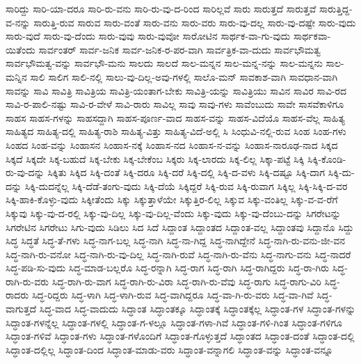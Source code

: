 {ಸಾರಿದ್ದು
ಸಾರಿ-ಯಾ-ದರೂ
ಸಾರಿ-ರು-ವನು
ಸಾರಿ-ರು-ವು-ದ-ರಿಂದ
ಸಾರಿಲ್ಲವೆ
ಸಾರು
ಸಾರುತ್ತದೆ
ಸಾರುತ್ತವೆ
ಸಾರುತ್ತಿದ್ದ-ವ-ನನ್ನು
ಸಾರುತ್ತಿ-ರುವ
ಸಾರುವ
ಸಾರು-ವಂತೆ
ಸಾರು-ವನು
ಸಾರು-ವರು
ಸಾರು-ವು-ದಲ್ಲ
ಸಾರು-ವು-ದಷ್ಟೇ
ಸಾರು-ವುದು
ಸಾರು-ವುದೆ
ಸಾರು-ವು-ದೆಂದು
ಸಾರು-ವುವು
ಸಾರು-ವುವೋ
ಸಾರೋಟಿನ
ಸಾರ್ಥಕ-ವಾ-ಗು-ವುದು
ಸಾರ್ಥಕವಾ-ಯಿತೆಂದು
ಸಾರ್ವಂತರ್
ಸಾರ್ವ-ಜನಿಕ
ಸಾರ್ವ-ಜನಿಕ-ರ-ಪರ-ವಾಗಿ
ಸಾರ್ವತ್ರಿಕ-ವಾ-ದುದು
ಸಾರ್ವಭೌಮತ್ವ
ಸಾರ್ವಭೌಮತ್ವ-ವನ್ನು
ಸಾರ್ವಭೌ-ಮನು
ಸಾಲದು
ಸಾಲದೆ
ಸಾಲ-ಮನ್ನನ
ಸಾಲ-ಮನ್ನ-ನನ್ನು
ಸಾಲ-ಮನ್ನನು
ಸಾಲ-ಮನ್ನಿನ
ಸಾಲಿ
ಸಾಲಿಗ
ಸಾಲಿ-ನಲ್ಲಿ
ಸಾಲು-ವು-ದಿಲ್ಲ-ಅವು-ಗಳಲ್ಲಿ
ಸಾಲೊ-ಮನ್
ಸಾವಕಾಶ-ವಾಗಿ
ಸಾವಧಾನ-ವಾಗಿ
ಸಾವನ್ನು
ಸಾವಿ
ಸಾವಿತ್ರಿ
ಸಾವಿತ್ರಿಯ
ಸಾವಿತ್ರಿ-ಯಂತಾಗ-ಬೇಕು
ಸಾವಿತ್ರಿ-ಯನ್ನು
ಸಾವಿತ್ರಿಯು
ಸಾವಿನ
ಸಾವಿರ
ಸಾವಿ-ರದ
ಸಾವಿ-ರ-ಪಾಲಿ-ನಷ್ಟು
ಸಾವಿ-ರ-ವೇಳೆ
ಸಾವಿ-ರಾರು
ಸಾವಿಲ್ಲ
ಸಾವು
ಸಾವು-ಗಳು
ಸಾವೆಂಬುದು
ಸಾವೇ
ಸಾಸವೆಕಾಳಿಗೂ
ಸಾಹಸ
ಸಾಹಸ-ಗಳನ್ನು
ಸಾಹಸದ್ದಾಗಿ
ಸಾಹಸ-ಪೂರ್ಣ-ವಾದ
ಸಾಹಸ-ವನ್ನು
ಸಾಹಸ-ವಿದೆಯೊ
ಸಾಹಸ-ವೆಲ್ಲ
ಸಾಹಿತ್ಯ
ಸಾಹಿತ್ಯದ
ಸಾಹಿತ್ಯ-ದಲ್ಲಿ
ಸಾಹಿತ್ಯ-ರಾಶಿ
ಸಾಹಿತ್ಯ-ವಿತ್ತು
ಸಾಹಿತ್ಯ-ವಿದೆ-ಅಲ್ಲಿ
ಸಿ
ಸಿಂಧುವಿ-ನಲ್ಲಿ-ರುವ
ಸಿಂಹ
ಸಿಂಹ-ಗಳು
ಸಿಂಹದ
ಸಿಂಹ-ವನ್ನು
ಸಿಂಹಾಸನ
ಸಿಂಹಾಸ-ನಕ್ಕೆ
ಸಿಂಹಾಸ-ನದ
ಸಿಂಹಾಸ-ನ-ವನ್ನು
ಸಿಂಹಾಸ-ನಾರೂಢ-ನಾದ
ಸಿಕ್ಕದ
ಸಿಕ್ಕದೆ
ಸಿಕ್ಕದೇ
ಸಿಕ್ಕ-ಬಹುದೆ
ಸಿಕ್ಕ-ಬೇಕು
ಸಿಕ್ಕ-ಬೇಕೆಂಬ
ಸಿಕ್ಕರು
ಸಿಕ್ಕ-ಲಾರದು
ಸಿಕ್ಕ-ಲಿಲ್ಲ
ಸಿಕ್ಕಾ-ಪಟ್ಟೆ
ಸಿಕ್ಕಿ
ಸಿಕ್ಕಿ-ಕೊಂಡಿ-ರು-ವು-ದನ್ನು
ಸಿಕ್ಕಿತು
ಸಿಕ್ಕಿದ
ಸಿಕ್ಕಿ-ದಂತೆ
ಸಿಕ್ಕಿ-ದರೂ
ಸಿಕ್ಕಿ-ದರೆ
ಸಿಕ್ಕಿ-ದಲ್ಲಿ
ಸಿಕ್ಕಿ-ದ-ವಳು
ಸಿಕ್ಕಿ-ದಷ್ಟೂ
ಸಿಕ್ಕಿ-ದಾಗ
ಸಿಕ್ಕಿ-ದು-ದನ್ನು
ಸಿಕ್ಕಿ-ದುದನ್ನೆಲ್ಲ
ಸಿಕ್ಕಿ-ದೆಡೆ-ತಂಗು-ವುದು
ಸಿಕ್ಕಿ-ದೆಯೆ
ಸಿಕ್ಕಿದ್ದರೆ
ಸಿಕ್ಕಿ-ರುವ
ಸಿಕ್ಕಿ-ರುವಾಗ
ಸಿಕ್ಕಿಲ್ಲ
ಸಿಕ್ಕಿ-ಸಿಕ್ಕಿ-ದ-ವರ
ಸಿಕ್ಕಿ-ಹಾಕಿ-ಕೊಳ್ಳು-ವುದು
ಸಿಕ್ಕೀತೆಂದು
ಸಿಕ್ಕು
ಸಿಕ್ಕುತ್ತಾಳೆಯೇ
ಸಿಕ್ಕುತ್ತಿರ-ಲಿಲ್ಲ
ಸಿಕ್ಕುವ
ಸಿಕ್ಕು-ವಂತಿಲ್ಲ
ಸಿಕ್ಕು-ವ-ವ-ರೆಗೆ
ಸಿಕ್ಕುವು
ಸಿಕ್ಕು-ವು-ದ-ರಲ್ಲಿ
ಸಿಕ್ಕು-ವು-ದಿಲ್ಲ
ಸಿಕ್ಕು-ವು-ದಿಲ್ಲ-ವೆಂದು
ಸಿಕ್ಕು-ವುದು
ಸಿಕ್ಕು-ವು-ದೆಂಬು-ದನ್ನು
ಸಿಗರೇಟನ್ನು
ಸಿಗರೇಟಿನ
ಸಿಗರೇಟು
ಸಿಗು-ವುದು
ಸಿಡಿಲು
ಸಿದ
ಸಿದೆ
ಸಿದ್ದಾಂತ
ಸಿದ್ದಾಂತದ
ಸಿದ್ದಾಂತ-ವಲ್ಲ
ಸಿದ್ದಾಂತವು
ಸಿದ್ದಾನೊ
ಸಿದ್ದು
ಸಿದ್ಧ
ಸಿದ್ಧತೆ
ಸಿದ್ಧ-ತೆ-ಗಳು
ಸಿದ್ಧ-ನಾಗ-ಬಲ್ಲ
ಸಿದ್ಧ-ನಾಗಿ
ಸಿದ್ಧ-ನಾ-ಗಿದ್ದ
ಸಿದ್ಧ-ನಾಗಿದ್ದೇನೆ
ಸಿದ್ಧ-ನಾಗಿ-ರು-ವನು-ಜೀ-ವನ
ಸಿದ್ಧ-ನಾಗಿ-ರು-ವನೋ
ಸಿದ್ಧ-ನಾಗಿ-ರು-ವು-ದಿಲ್ಲ
ಸಿದ್ಧ-ನಾಗಿ-ರುವೆ
ಸಿದ್ಧ-ನಾಗಿ-ರು-ವೆನು
ಸಿದ್ಧ-ನಾಗು-ವನು
ಸಿದ್ಧ-ನಾದರೆ
ಸಿದ್ಧ-ಪಡಿ-ಸು-ವುದು
ಸಿದ್ಧ-ಮಾಡ-ಬಲ್ಲರೊ
ಸಿದ್ಧ-ರನ್ನಾಗಿ
ಸಿದ್ಧ-ರಾಗ
ಸಿದ್ಧ-ರಾಗಿ
ಸಿದ್ಧ-ರಾಗಿದ್ದರು
ಸಿದ್ಧ-ರಾ-ಗಿರು
ಸಿದ್ಧ-ರಾಗಿ-ರು-ವರು
ಸಿದ್ಧ-ರಾಗಿ-ರು-ವಾಗ
ಸಿದ್ಧ-ರಾಗಿ-ರು-ವಿರಾ
ಸಿದ್ಧ-ರಾಗಿ-ರು-ವೆವು
ಸಿದ್ಧ-ರಾಗು
ಸಿದ್ಧ-ರಾಗು-ವಿರಿ
ಸಿದ್ಧ-ರಾದರು
ಸಿದ್ಧ-ರಿದ್ದರು
ಸಿದ್ಧ-ಳಾಗಿ
ಸಿದ್ಧ-ಳಾಗಿ-ರುವ
ಸಿದ್ಧ-ವಾಗಿದ್ದರೂ
ಸಿದ್ಧ-ವಾ-ಗಿ-ರು-ವರು
ಸಿದ್ಧ-ವಾ-ಗಿವೆ
ಸಿದ್ಧ-ವಾಗುತ್ತದೆ
ಸಿದ್ಧ-ವಾದ
ಸಿದ್ಧ-ವಾದುದು
ಸಿದ್ಧಾಂತ
ಸಿದ್ಧಾಂತಕ್ಕೂ
ಸಿದ್ಧಾಂತಕ್ಕೆ
ಸಿದ್ಧಾಂತಕ್ಕೆಲ್ಲ
ಸಿದ್ಧಾಂತ-ಗಳ
ಸಿದ್ಧಾಂತ-ಗಳನ್ನು
ಸಿದ್ಧಾಂತ-ಗಳನ್ನೆಲ್ಲ
ಸಿದ್ಧಾಂತ-ಗಳಲ್ಲಿ
ಸಿದ್ಧಾಂತ-ಗ-ಳಲ್ಲೂ
ಸಿದ್ಧಾಂತ-ಗಳಾ-ಗಿವೆ
ಸಿದ್ಧಾಂತ-ಗಳಿ-ಗಿಂತ
ಸಿದ್ಧಾಂತ-ಗಳಿಗೂ
ಸಿದ್ಧಾಂತ-ಗಳಿವೆ
ಸಿದ್ಧಾಂತ-ಗಳು
ಸಿದ್ಧಾಂತ-ಗಳೊಂದಿಗೆ
ಸಿದ್ಧಾಂತ-ಗೊಳ್ಳುತ್ತದೆ
ಸಿದ್ಧಾಂತದ
ಸಿದ್ಧಾಂತ-ದಂತೆ
ಸಿದ್ಧಾಂತ-ದಲ್ಲಿ
ಸಿದ್ಧಾಂತ-ದಲ್ಲಿಲ್ಲ
ಸಿದ್ಧಾಂತ-ದಿಂದ
ಸಿದ್ಧಾಂತ-ಮಾಡು-ವರು
ಸಿದ್ಧಾಂತ-ವನ್ನಾಗಲಿ
ಸಿದ್ಧಾಂತ-ವನ್ನು
ಸಿದ್ಧಾಂತ-ವನ್ನೂ
}
